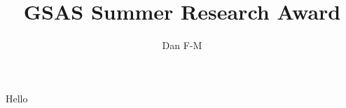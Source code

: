 \documentclass[11pt]{article}
\title{GSAS Summer Research Award}
\author{Dan F-M}
\begin{document}
Hello
\end{document}
